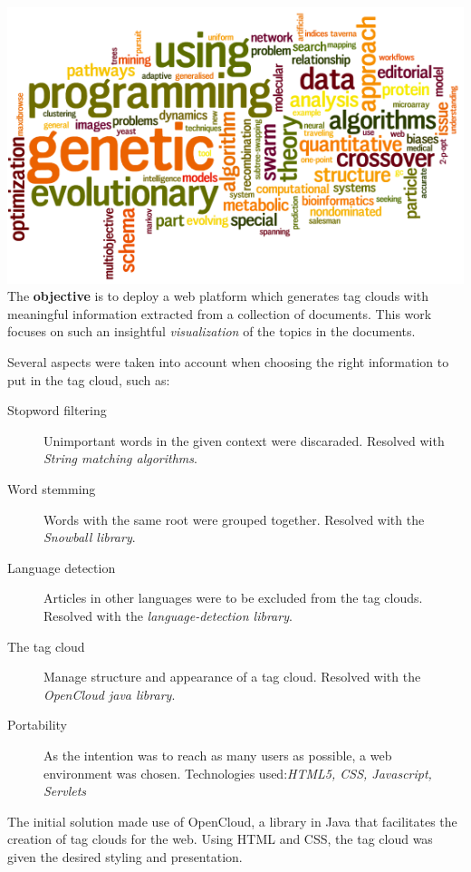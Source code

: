\documentclass[a0paper, portrait]{baposter}
\begin{document}
\begin{poster}
{    %
    \includegraphics[width=\linewidth]{wordle2.png}
    \newline
    The {\bf objective} is to deploy a web platform which generates tag clouds with meaningful information extracted from a collection of documents. This work focuses on such an insightful {\em visualization} of the topics in the documents. %
  }

   {
    Several aspects were taken into account when choosing the right information to put in the tag cloud, such as: \newline
    \begin{description}
    \item[Stopword filtering] Unimportant words in the given context were discaraded. Resolved with {\em String matching algorithms}.
    \item[Word stemming] Words with the same root were grouped together. Resolved with the {\em Snowball library}.
    \item[Language detection] Articles in other languages were to be excluded from the tag clouds. Resolved with the {\em language-detection library}.
    \item[The tag cloud] Manage structure and appearance of a tag cloud. Resolved with the {\em OpenCloud java library}.
    \item[Portability] As the intention was to reach as many users as possible, a web environment was chosen. Technologies used:{\em HTML5, CSS, Javascript, Servlets}
    \end{description}
  }
   {
    The initial solution made use of OpenCloud, a library in Java that facilitates the creation of tag clouds for the web. Using HTML and CSS, the tag cloud was given the desired styling and presentation.
    
}
\end{poster}
\end{document}
